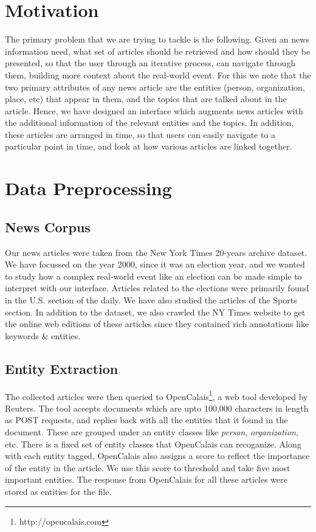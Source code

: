 \documentclass{acm_proc_article-sp}
\begin{document}
\section{Motivation}
The primary problem that we are trying to tackle is the following. Given an news information need, what set of articles should be retrieved and how should they be presented, so that the user through an iterative process, can navigate through them, building more context about the real-world event. For this we note that the two primary attributes of any news article are the entities (person, organization, place, etc) that appear in them, and the topics that are talked about in the article. Hence, we have designed an interface which augments news articles with the additional information of the relevant entities and the topics. In addition, these articles are arranged in time, so that users can easily navigate to a particular point in time, and look at how various articles are linked together.
\section{Data Preprocessing}
\subsection{News Corpus}
Our news articles were taken from the New York Times 20-years archive dataset. We have focussed on the year 2000, since it was an election year, and we wanted to study how a complex real-world event like an election can be made simple to interpret with our interface. Articles related to the elections were primarily found in the U.S. section of the daily. We have also studied the articles of the Sports section. In addition to the dataset, we also crawled the NY Times website to get the online web editions of these articles since they contained rich annotations like keywords \& entities.

\subsection{Entity Extraction}
The collected articles were then queried to OpenCalais\footnote{http://opencalais.com}, a web tool developed by Reuters. The tool accepts documents which are upto 100,000 characters in length as POST requests, and replies back with all the entities that it found in the document. These are grouped under an entity classes like \emph{person}, \emph{organization}, etc. There is a fixed set of entity classes that OpenCalais can recoganize. Along with each entity tagged, OpenCalais also assigns a score to reflect the importance of the entity in the article. We use this score to threshold and take five most important entities. The response from OpenCalais for all these articles were stored as entities for the file.
\end{document}
